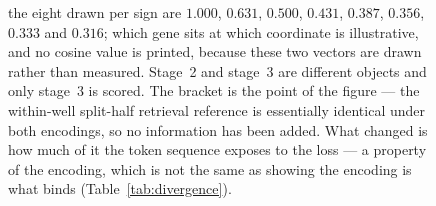 \begin{figure}[htbp]
\begin{fullwidth}
{the eight drawn per sign are $1.000$, $0.631$, $0.500$, $0.431$, $0.387$,
$0.356$, $0.333$ and $0.316$; which gene sits at which coordinate is
illustrative, and no cosine value is printed, because these two vectors are
drawn rather than measured. Stage~2 and stage~3 are different objects and only
stage~3 is scored. The bracket is the point of the figure --- the within-well
split-half retrieval reference is essentially identical under both encodings, so
no information has been added. What changed is how much of it the token sequence
exposes to the loss --- a property of the encoding, which is not the same as
showing the encoding is what binds (Table~\ref{tab:divergence}).}
\label{fig:frame}
\end{fullwidth}
\end{figure}
